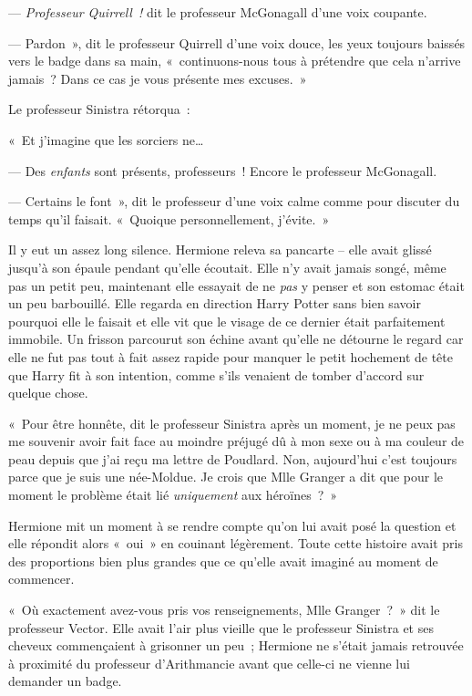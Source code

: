 --- \emph{Professeur Quirrell~!} dit le professeur McGonagall d'une voix coupante.

--- Pardon~», dit le professeur Quirrell d'une voix douce, les yeux toujours baissés vers le badge dans sa main, «~continuons-nous tous à prétendre que cela n'arrive jamais~? Dans ce cas je vous présente mes excuses.~»

Le professeur Sinistra rétorqua~:

«~Et j'imagine que les sorciers ne…

--- Des \emph{enfants} sont présents, professeurs~! Encore le professeur McGonagall.

--- Certains le font~», dit le professeur d'une voix calme comme pour discuter du temps qu'il faisait. «~Quoique personnellement, j'évite.~»

Il y eut un assez long silence. Hermione releva sa pancarte -- elle avait glissé jusqu'à son épaule pendant qu'elle écoutait. Elle n'y avait jamais songé, même pas un petit peu, maintenant elle essayait de ne \emph{pas} y penser et son estomac était un peu barbouillé. Elle regarda en direction Harry Potter sans bien savoir pourquoi elle le faisait et elle vit que le visage de ce dernier était parfaitement immobile. Un frisson parcourut son échine avant qu'elle ne détourne le regard car elle ne fut pas tout à fait assez rapide pour manquer le petit hochement de tête que Harry fit à son intention, comme s'ils venaient de tomber d'accord sur quelque chose.

«~Pour être honnête, dit le professeur Sinistra après un moment, je ne peux pas me souvenir avoir fait face au moindre préjugé dû à mon sexe ou à ma couleur de peau depuis que j'ai reçu ma lettre de Poudlard. Non, aujourd'hui c'est toujours parce que je suis une née-Moldue. Je crois que Mlle Granger a dit que pour le moment le problème était lié \emph{uniquement} aux héroïnes~?~»

Hermione mit un moment à se rendre compte qu'on lui avait posé la question et elle répondit alors «~oui~» en couinant légèrement. Toute cette histoire avait pris des proportions bien plus grandes que ce qu'elle avait imaginé au moment de commencer.

«~Où exactement avez-vous pris vos renseignements, Mlle Granger~?~» dit le professeur Vector. Elle avait l'air plus vieille que le professeur Sinistra et ses cheveux commençaient à grisonner un peu~; Hermione ne s'était jamais retrouvée à proximité du professeur d'Arithmancie avant que celle-ci ne vienne lui demander un badge.

